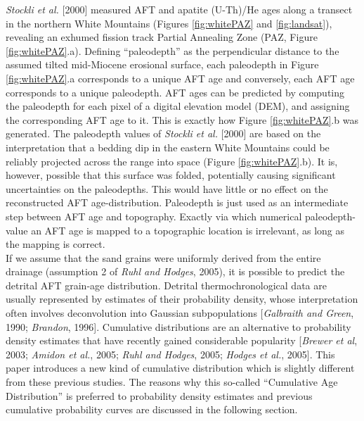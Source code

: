 \documentclass[12pt,twoside]{article}
\begin{document}
{\it Stockli et  al.}  [2000] measured AFT and  apatite (U-Th)/He ages
along   a  transect   in   the  northern   White  Mountains   (Figures
\ref{fig:whitePAZ}   and  \ref{fig:landsat}),  revealing   an  exhumed
fission     track    Partial     Annealing    Zone     (PAZ,    Figure
\ref{fig:whitePAZ}.a).   Defining ``paleodepth'' as  the perpendicular
distance  to the  assumed tilted  mid-Miocene erosional  surface, each
paleodepth in Figure \ref{fig:whitePAZ}.a  corresponds to a unique AFT
age and conversely,  each AFT age corresponds to  a unique paleodepth. 
AFT ages can  be predicted by computing the  paleodepth for each pixel
of a  digital elevation model  (DEM), and assigning  the corresponding
AFT age  to it.  This  is exactly how Figure  \ref{fig:whitePAZ}.b was
generated.  The paleodepth  values of {\it Stockli et  al.} [2000] are
based on  the interpretation that a  bedding dip in  the eastern White
Mountains  could be  reliably projected  across the  range  into space
(Figure  \ref{fig:whitePAZ}.b).  It  is, however,  possible  that this
surface was  folded, potentially causing  significant uncertainties on
the  paleodepths.   This  would  have  little  or  no  effect  on  the
reconstructed  AFT age-distribution.   Paleodepth is  just used  as an
intermediate step  between AFT age and topography.   Exactly via which
numerical  paleodepth-value an  AFT  age is  mapped  to a  topographic
location is irrelevant, as long as the mapping is correct.
\\

If  we assume that  the sand  grains were  uniformly derived  from the
entire drainage (assumption  2 of {\it Ruhl and  Hodges}, 2005), it is
possible to predict the detrital AFT grain-age distribution.  Detrital
thermochronological data are usually represented by estimates of their
probability density, whose interpretation often involves deconvolution
into Gaussian  subpopulations [{\it  Galbraith and Green},  1990; {\it
  Brandon},  1996].  Cumulative  distributions are  an  alternative to
probability density  estimates that have  recently gained considerable
popularity [{\it Brewer et al},  2003; {\it Amidon et al.}, 2005; {\it
  Ruhl  and Hodges},  2005; {\it  Hodges et  al.}, 2005].   This paper
introduces  a new kind  of cumulative  distribution which  is slightly
different from these previous studies.  The reasons why this so-called
``Cumulative  Age Distribution'' is  preferred to  probability density
estimates and previous cumulative  probability curves are discussed in
the following section.
\\
\end{document}
